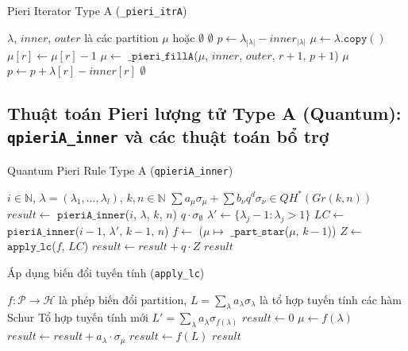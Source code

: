 \begin{algorithm}[H]
\caption{Pieri Iterator Type A (\texttt{\_pieri\_itrA})}
\begin{algorithmic}[1]
\REQUIRE $\lambda$, $inner$, $outer$ là các partition
\ENSURE $\mu$ hoặc $\emptyset$
\IF{$\lambda = \emptyset$}
    \RETURN $\emptyset$
\ENDIF
\STATE $p \gets \lambda_{|\lambda|} - inner_{|\lambda|}$
        \STATE $\mu \gets \lambda.\mathtt{copy}()$
        \STATE $\mu[r] \gets \mu[r] - 1$
        \STATE $\mu \gets$ $\mathtt{\_pieri\_fillA}$($\mu$, $inner$, $outer$, $r+1$, $p+1$)
        \IF{$\mu \neq \emptyset$}
            \RETURN $\mu$
        \ENDIF
    \ENDIF
    \STATE $p \gets p + \lambda[r] - inner[r]$
\ENDFOR
\RETURN $\emptyset$
\end{algorithmic}
\end{algorithm}

\subsection*{Thuật toán Pieri lượng tử Type A (Quantum): \texttt{qpieriA\_inner} và các thuật toán bổ trợ}

\begin{algorithm}[H]
\caption{Quantum Pieri Rule Type A (\texttt{qpieriA\_inner})}
\begin{algorithmic}[1]
\REQUIRE $i \in \mathbb{N}$, $\lambda = (\lambda_1, ..., \lambda_l)$, $k, n \in \mathbb{N}$
\ENSURE $\sum a_\mu \sigma_\mu + \sum b_\nu q^d \sigma_\nu \in QH^*(Gr(k,n))$
\STATE $result \gets$ $\mathtt{pieriA\_inner}$($i$, $\lambda$, $k$, $n$) 
        \RETURN $q \cdot \sigma_{\emptyset}$
    \ENDIF
    \STATE $\lambda' \gets \{\lambda_j - 1 : \lambda_j > 1\}$
    \STATE $LC \gets$ $\mathtt{pieriA\_inner}$($i-1$, $\lambda'$, $k-1$, $n$)
    \STATE $f \gets$ ($\mu \mapsto$ $\mathtt{\_part\_star}$($\mu$, $k-1$))
    \STATE $Z \gets$ $\mathtt{apply\_lc}$($f$, $LC$)
    \STATE $result \gets result + q \cdot Z$
\ENDIF
\RETURN $result$
\end{algorithmic}
\end{algorithm}

\begin{algorithm}[H]
    \caption{Áp dụng biến đổi tuyến tính (\texttt{apply\_lc})}
    \begin{algorithmic}[1]
    \REQUIRE $f: \mathcal{P} \to \mathcal{H}$ là phép biến đổi partition, $L = \sum_\lambda a_\lambda \sigma_\lambda$ là tổ hợp tuyến tính các hàm Schur
    \ENSURE Tổ hợp tuyến tính mới $L' = \sum_\lambda a_\lambda \sigma_{f(\lambda)}$
    \STATE $result \gets 0$
            \STATE $\mu \gets f(\lambda)$
            \STATE $result \gets result + a_\lambda \cdot \sigma_\mu$
        \ENDFOR
    \ELSE
        \STATE $result \gets f(L)$ 
    \ENDIF
    \RETURN $result$
    \end{algorithmic}
    \end{algorithm}

